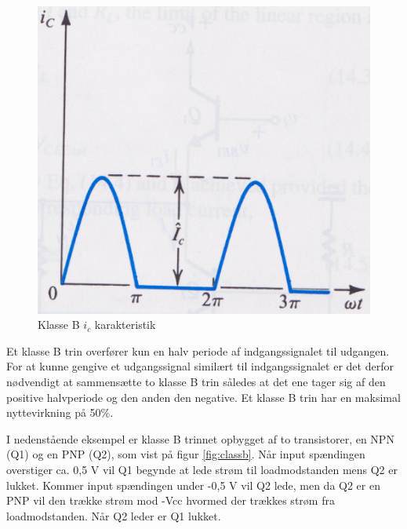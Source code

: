 \begin{figure}[h]
\centering
\includegraphics[scale=.35]{indledende_analyse/klasser/klasseb.png}
\caption{Klasse B $i_c$ karakteristik}
\label{fig:klasseb}
\end{figure}

Et klasse B trin overfører kun en halv periode af indgangssignalet til udgangen. For at kunne gengive et udgangssignal similært til indgangssignalet er det derfor nødvendigt at sammensætte to klasse B trin således at det ene tager sig af den positive halvperiode og den anden den negative.
Et klasse B trin har en maksimal nyttevirkning på 50\%.

I nedenstående eksempel er klasse B trinnet opbygget af to transistorer, en NPN (Q1) og en PNP (Q2), som vist på figur \ref{fig:classb}. Når input spændingen overstiger ca. 0,5 V vil Q1 begynde at lede strøm til loadmodstanden mens Q2 er lukket. Kommer input spændingen under -0,5 V vil Q2 lede, men da Q2 er en PNP vil den trække strøm mod -Vcc hvormed der trækkes strøm fra loadmodstanden. Når Q2 leder er Q1 lukket. 

